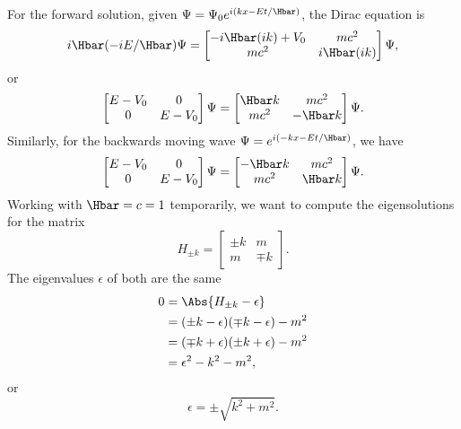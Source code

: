 For the forward solution, given \( \Psi = \Psi_0 e^{i(k x - E t/\Hbar) } \), the Dirac equation is
%
\begin{equation}\label{eqn:gradQuantumProblemSet4Problem3:20}
i \Hbar (-i E/\Hbar) \Psi =
\begin{bmatrix}
-i \Hbar (i k) + V_0 & m c^2 \\
m c^2 & i \Hbar (i k)
\end{bmatrix}
\Psi,
\end{equation}
or
\begin{equation}\label{eqn:gradQuantumProblemSet4Problem3:40}
\begin{bmatrix}
E - V_0 & 0 \\
0 & E - V_0
\end{bmatrix}
\Psi
=
\begin{bmatrix}
\Hbar k & m c^2 \\
m c^2 &  - \Hbar k
\end{bmatrix}
\Psi.
\end{equation}
%
Similarly, for the backwards moving wave \( \Psi = e^{i(-k x - E t/\Hbar)} \), we have
%
\begin{equation}\label{eqn:gradQuantumProblemSet4Problem3:60}
\begin{bmatrix}
E - V_0 & 0 \\
0 & E - V_0
\end{bmatrix}
\Psi
=
\begin{bmatrix}
-\Hbar k & m c^2 \\
m c^2 & \Hbar k
\end{bmatrix}
\Psi.
\end{equation}
%
Working with \( \Hbar = c = 1 \) temporarily, we want to compute the eigensolutions for the matrix
%
\begin{equation}\label{eqn:gradQuantumProblemSet4Problem3:80}
H_{\pm k}
=
\begin{bmatrix}
\pm k & m \\
m & \mp k
\end{bmatrix}.
\end{equation}
%
The eigenvalues \( \epsilon \) of both are the same
%
\begin{equation}\label{eqn:gradQuantumProblemSet4Problem3:100}
\begin{aligned}
0
&=
\Abs{ H_{\pm k} - \epsilon }
\\ &=
(\pm k - \epsilon)(\mp k - \epsilon) - m^2
\\ &=
(\mp k + \epsilon)(\pm k + \epsilon) - m^2
\\ &=
\epsilon^2 - k^2 - m^2,
\end{aligned}
\end{equation}
%
or
%
\begin{equation}\label{eqn:gradQuantumProblemSet4Problem3:120}
\epsilon = \pm \sqrt{k^2 + m^2}.
\end{equation}
%
